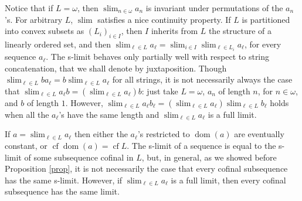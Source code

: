 \documentclass[12pt]{amsart}
\theoremstyle{definition}
\theoremstyle{remark}
\begin{document}
Notice that if $L = \omega $, then 
$\operatorname{slim}_{n \in \omega } a_ n $ 
is invariant under permutations of the 
$a_n$'s.
For arbitrary $L$, 
$\operatorname{slim}$ satisfies a nice continuity property.
If $L$ is partitioned into convex subsets as $( L_i) _{i \in I} $,
then $I$ inherits from $L$ the structure of a linearly ordered set, 
and then   $\operatorname{slim}_{\ell \in L} a_ \ell = \operatorname{slim}_{i \in I} \operatorname{slim}_{\ell \in L_i} a_ \ell $,
for every sequence $a_ \ell $.
The s-limit behaves only partially well with respect to 
string concatenation, that we shall denote by juxtaposition.
Though $\operatorname{slim}_{\ell \in L} ba_ \ell =b \operatorname{slim}_{\ell \in L} a_ \ell $ 
for all strings, it is not necessarily always the case
that $\operatorname{slim}_{\ell \in L} a_ \ell b = (\operatorname{slim}_{\ell \in L} a_ \ell) b $:
just take $L= \omega $, $a_n$ of length $n$, for $n \in \omega$,  
and $b$ of length $1$. However,
  $\operatorname{slim}_{\ell \in L} a_ \ell b_ \ell = (\operatorname{slim}_{\ell \in L} a_ \ell)
\operatorname{slim}_{\ell \in L} b_ \ell $
holds when all the $a_ \ell $'s have the same length and 
$\operatorname{slim}_{\ell \in L} a_ \ell$ is a full limit.

If $a= \operatorname{slim}_{\ell \in L} a_ \ell  $ 
then either the $a_\ell$'s restricted to   $\operatorname{dom} (a)$ are
eventually constant, or  $\operatorname{cf} \operatorname{dom} (a) = \operatorname{cf} L$.  
The s-limit of a sequence is equal to the s-limit 
of some subsequence cofinal in $L$, but, in general, 
as we showed before Proposition \ref{prop}, 
it is not necessarily
the case that every cofinal subsequence has the same s-limit.
However, if $\operatorname{slim}_{\ell \in L} a_ \ell$ is a full limit,
then every cofinal subsequence has the same limit.
\end{document}
